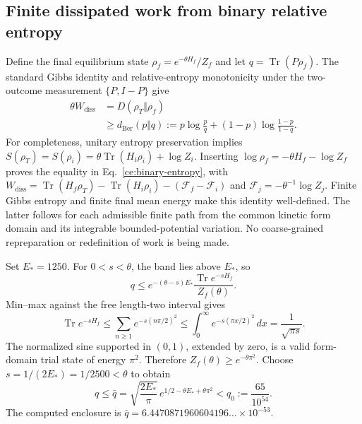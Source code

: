 \documentclass[aps,prl,reprint,superscriptaddress,longbibliography]{revtex4-2}
\begin{document}
\subsection{Finite dissipated work from binary relative entropy}

Define the final equilibrium state
$\rho_f=e^{-\theta H_f}/Z_f$ and let $q=\operatorname{Tr}(P\rho_f)$.
The standard Gibbs identity and relative-entropy monotonicity under the
two-outcome measurement $\{P,I-P\}$ give \cite{Deffner,Lindblad}
\begin{align}
 \theta W_{\mathrm{diss}}
 &=D(\rho_T\Vert\rho_f)\nonumber\\
 &\ge d_{\mathrm{Ber}}(p\Vert q)
   :=p\log\frac pq+(1-p)\log\frac{1-p}{1-q}.
 \label{ce:binary-entropy}
\end{align}
For completeness, unitary entropy preservation implies
$S(\rho_T)=S(\rho_i)=\theta\operatorname{Tr}(H_i\rho_i)+\log Z_i$.
Inserting $\log\rho_f=-\theta H_f-\log Z_f$ proves the equality in
Eq.~\eqref{ce:binary-entropy}, with
$W_{\mathrm{diss}}=\operatorname{Tr}(H_f\rho_T)
-\operatorname{Tr}(H_i\rho_i)-(\mathcal F_f-\mathcal F_i)$ and
$\mathcal F_j=-\theta^{-1}\log Z_j$.
Finite Gibbs entropy and finite final mean energy make this identity
well-defined. The latter follows for each admissible finite path from
the common kinetic form domain and its integrable bounded-potential
variation. No coarse-grained repreparation or redefinition of work is
being made.

Set $E_*=1250$. For $0<s<\theta$, the band lies above $E_*$, so
\begin{equation}
 q\le e^{-(\theta-s)E_*}
       \frac{\operatorname{Tr}e^{-sH_f}}{Z_f(\theta)}.
 \label{ce:final-tail}
\end{equation}
Min--max against the free length-two interval gives
\begin{equation}
 \operatorname{Tr}e^{-sH_f}
 \le\sum_{n\ge1}e^{-s(n\pi/2)^2}
 \le\int_0^\infty e^{-s(\pi x/2)^2}\,dx
 =\frac1{\sqrt{\pi s}}.
 \label{ce:heat-trace}
\end{equation}
The normalized sine supported in $(0,1)$, extended by zero, is a valid
form-domain trial state of energy $\pi^2$. Therefore
$Z_f(\theta)\ge e^{-\theta\pi^2}$. Choose
$s=1/(2E_*)=1/2500<\theta$ to obtain
\begin{equation}
 q\le\bar q=
 \sqrt{\frac{2E_*}{\pi}}\,
 e^{1/2-\theta E_*+\theta\pi^2}
 <q_0:=\frac{65}{10^{54}}.
 \label{ce:final-equilibrium-bound}
\end{equation}
The computed enclosure is
$\bar q=6.4470871960604196\ldots\times10^{-53}$.
\end{document}

